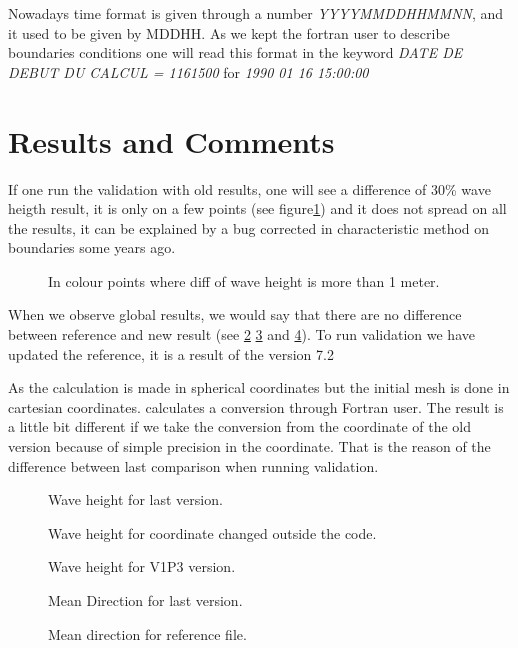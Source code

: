 Nowadays time format is given through a number \textit{YYYYMMDDHHMMNN}, and it
used to be given by MDDHH. As we kept the fortran user to describe boundaries
conditions one will read this format in the keyword \textit{DATE DE DEBUT DU
  CALCUL = 1161500} for \textit{1990 01 16 15:00:00}

\section{Results and Comments}

If one run the validation with old results, one will see a difference of
30\% wave heigth result, it is only on a few points (see
figure\ref{figmanchedif}) and it does not spread on all the results, it can be
explained by a bug corrected in characteristic method on boundaries some years
ago. 
\begin{figure} [!h]
\centering
{}
 \caption{In colour points where diff of wave height is more than 1 meter.}
\label{figmanchedif}
\end{figure}

When we observe global results, we would say that there are no difference
between reference and new result (see \ref{figmanchehm0} \ref{figmanchehm02}
and \ref{figmanchehm0v1P3}). To run validation we have updated the reference,
it is a result of the version 7.2

As the calculation is made in spherical coordinates but the initial mesh is
done in cartesian coordinates. \tomawac calculates a conversion through Fortran
user. The result is a little bit different if we take the conversion from the
coordinate of the old version because of simple precision in the coordinate.
That is the reason of the difference between last comparison when running
validation.  

\begin{figure} [!h]
\centering
{}
 \caption{Wave height for last version.}
\label{figmanchehm0}
\end{figure}
\begin{figure} [!h]
\centering
{}
 \caption{Wave height for coordinate changed outside the code.}
\label{figmanchehm02}
\end{figure}
\begin{figure} [!h]
\centering
{}
 \caption{Wave height for V1P3 version.}
\label{figmanchehm0v1P3}
\end{figure}
\begin{figure} [!h]
\centering
{}
 \caption{Mean Direction for last version.}
\label{figmanchedirection}
\end{figure}
\begin{figure} [!h]
\centering
{}
 \caption{Mean direction for reference file.}
\label{figmanchedirectionref}
\end{figure}
